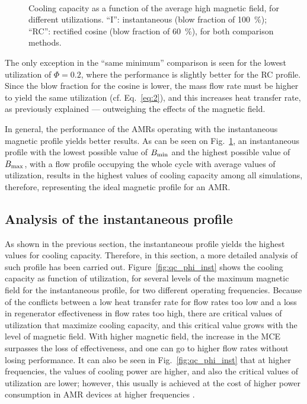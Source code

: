 \documentclass[draft]{svjour3}
\newcommand{\bmax}{\ensuremath{{B}\ped{max}}}
\newcommand{\bmin}{\ensuremath{{B}\ped{min}}}
\begin{document}
\begin{figure}[!ht]
  \centering
\,
\,
  \caption{Cooling capacity as a function of the  average high magnetic field, for different utilizations. “I”: instantaneous (blow fraction of \SI{100}{\percent}); “RC”: rectified cosine  (blow fraction of \SI{60}{\percent}), for both comparison methods.}
 \label{fig:cos_ins}
\end{figure}

The only exception in the ``same minimum'' comparison is seen for the lowest utilization of $\Phi = 0.2$, where the performance is slightly better for the RC profile. Since the blow fraction for the cosine is lower, the mass flow rate must be higher to yield the same utilization (cf. Eq.~\eqref{eq:2}), and this increases heat transfer rate, as previously explained ---  outweighing the effects of the magnetic field.

In general, the performance of the AMRs operating with the instantaneous magnetic profile yields better results. As can be seen on Fig.~\ref{fig:cos_ins}, an instantaneous profile with the lowest possible value of $\bmin$ and the highest possible value of $\bmax$, with a flow profile occupying the whole cycle with average values of utilization, results in the highest values of cooling capacity among all simulations, therefore, representing the ideal magnetic profile for an AMR.

\subsection{Analysis of the instantaneous profile}
\label{sec:deta-analys-inst}

As shown in the previous section, the instantaneous profile yields the highest values for cooling capacity. Therefore, in this section, a more detailed analysis of such profile has been carried out. Figure~\ref{fig:qc_phi_inst} shows the cooling capacity as function of utilization, for several levels of the maximum magnetic field for the instantaneous profile, for two different operating frequencies. Because of the conflicts between a low heat transfer rate for flow rates too low and a loss in regenerator effectiveness in flow rates too high, there are critical values of utilization that maximize cooling capacity, and this critical value grows with the level of magnetic field. With higher magnetic field, the increase in the MCE surpasses the loss of effectiveness, and one can go to higher flow rates without losing performance. It can also be seen in Fig.~\ref{fig:qc_phi_inst} that at higher frequencies, the values of cooling power are higher, and also the critical values of utilization are lower; however, this usually is achieved at the cost of higher power consumption in AMR devices at higher frequencies \cite{bib:lei15_study,NIKNIA2016601}.
\end{document}
